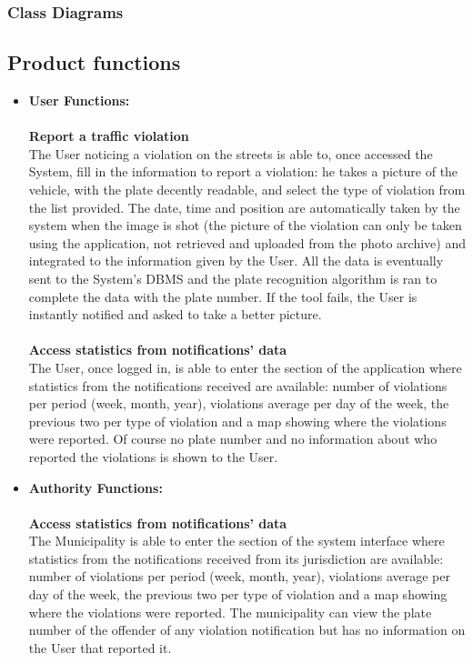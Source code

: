 \documentclass {article}
\begin{document}
		
	\subsubsection{Class Diagrams}
		

	\subsection{Product functions} 
	\begin{itemize}
	\item {\bf User Functions:} \\ \\
		{\bf Report a traffic violation} \\
		The User noticing a violation on the streets is able to, once accessed the System, fill in the information to report a violation: he takes a picture of the vehicle, with the plate decently readable, and select the type of violation from the list provided. The date, time and position are automatically taken by the system when the image is shot (the picture of the violation can only be taken using the application, not retrieved and uploaded from the photo archive) and integrated to the information given by the User. All the data is eventually sent to the System’s DBMS and the plate recognition algorithm is ran to complete the data with the plate number. If the tool fails, the User is instantly notified and asked to take a better picture. \\ \\ 
		{\bf Access statistics from notifications’ data}\\
		The User, once logged in, is able to enter the section of the application where statistics from the notifications received are available: number of violations per period (week, month, year), violations average per day of the week, the previous two per type of violation and a map showing where the violations were reported. Of course no plate number and no information about who reported the violations is shown to the User.\\ 
	\item {\bf Authority Functions:} \\ \\
		{\bf Access statistics from notifications’ data}\\
		The Municipality is able to enter the section of the system interface where statistics from the notifications received from its jurisdiction are available: number of violations per period (week, month, year), violations average per day of the week, the previous two per type of violation and a map showing where the violations were reported. The municipality can view the plate number of the offender of any violation notification but has no information on the User that reported it. \\ \\

\end{itemize}
\end{document}
